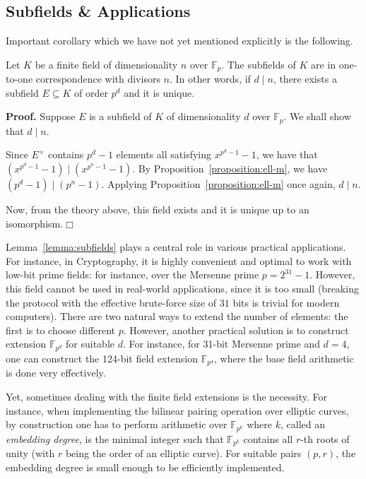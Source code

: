 \documentclass{template}
\newcommand{\qedwhite}{\hfill \ensuremath{\Box}}
\begin{document}
\subsection{Subfields \& Applications}

Important corollary which we have not yet mentioned explicitly is the following. 

\begin{lemma}\label{lemma:subfields} 
    Let $K$ be a finite field of dimensionality $n$
    over $\mathbb{F}_p$. The subfields of $K$ are in one-to-one correspondence
    with divisors $n$. In other words, if $d \mid n$, there exists a subfield $E
    \subseteq K$ of order $p^d$ and it is unique.
\end{lemma}

\textbf{Proof.} Suppose $E$ is a subfield of $K$ of dimensionality $d$ over
$\mathbb{F}_p$. We shall show that $d \mid n$.

Since $E^{\times}$ contains $p^d-1$ elements all satisfying $x^{p^d-1}-1$, we
have that $(x^{p^d-1}-1) \mid (x^{p^n-1}-1)$. By
Proposition~\ref{proposition:ell-m}, we have $(p^d-1) \mid (p^n-1)$. Applying
Proposition~\ref{proposition:ell-m} once again, $d \mid n$.

Now, from the theory above, this field exists and it is unique up to an
isomorphism.\qedwhite

Lemma~\ref{lemma:subfields} plays a central role in various practical
applications. For instance, in Cryptography, it is highly convenient and optimal
to work with low-bit prime fields: for instance, over the Mersenne prime
$p=2^{31}-1$. However, this field cannot be used in real-world applications,
since it is too small (breaking the protocol with the effective brute-force size
of $31$ bits is trivial for modern computers). There are two natural ways to
extend the number of elements: the first is to choose different $p$. However,
another practical solution is to construct extension $\mathbb{F}_{p^d}$ for
suitable $d$. For instance, for 31-bit Mersenne prime and $d=4$, one can
construct the 124-bit field extension $\mathbb{F}_{p^4}$, where the base field
arithmetic is done very effectively.

Yet, sometimes dealing with the finite field extensions is the necessity. For
instance, when implementing the bilinear pairing operation over elliptic curves,
by construction one has to perform arithmetic over $\mathbb{F}_{p^k}$ where $k$,
called an \textit{embedding degree}, is the minimal integer such that
$\mathbb{F}_{p^k}$ contains all $r$-th roots of unity (with $r$ being the order
of an elliptic curve). For suitable pairs $(p,r)$, the embedding degree is small
enough to be efficiently implemented.
\end{document}
